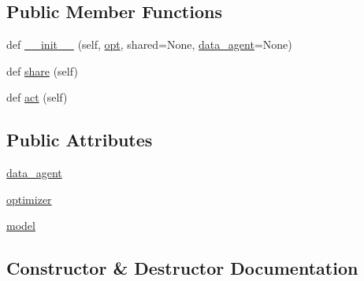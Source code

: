 \subsection*{Public Member Functions}
\begin{DoxyCompactItemize}
\item 
def \hyperlink{classprojects_1_1mastering__the__dungeon_1_1agents_1_1graph__world2_1_1agents_1_1ModelAgentBase_a2904306e4e9d603a78a72e65919fb63c}{\+\_\+\+\_\+init\+\_\+\+\_\+} (self, \hyperlink{classparlai_1_1core_1_1agents_1_1Agent_ab3b45d2754244608c75d4068b90cd051}{opt}, shared=None, \hyperlink{classprojects_1_1mastering__the__dungeon_1_1agents_1_1graph__world2_1_1agents_1_1ModelAgentBase_a229b7901e20dced7e3b3c3e2d381d2ce}{data\+\_\+agent}=None)
\item 
def \hyperlink{classprojects_1_1mastering__the__dungeon_1_1agents_1_1graph__world2_1_1agents_1_1ModelAgentBase_a337693c63ecfac3f01f9e430fb3f8fc9}{share} (self)
\item 
def \hyperlink{classprojects_1_1mastering__the__dungeon_1_1agents_1_1graph__world2_1_1agents_1_1ModelAgentBase_ae233cafdd579db9c82776eb58373145a}{act} (self)
\end{DoxyCompactItemize}
\subsection*{Public Attributes}
\begin{DoxyCompactItemize}
\item 
\hyperlink{classprojects_1_1mastering__the__dungeon_1_1agents_1_1graph__world2_1_1agents_1_1ModelAgentBase_a229b7901e20dced7e3b3c3e2d381d2ce}{data\+\_\+agent}
\item 
\hyperlink{classprojects_1_1mastering__the__dungeon_1_1agents_1_1graph__world2_1_1agents_1_1ModelAgentBase_ade53b46fb7a392e148f69d289c496252}{optimizer}
\item 
\hyperlink{classprojects_1_1mastering__the__dungeon_1_1agents_1_1graph__world2_1_1agents_1_1ModelAgentBase_af5ff64fd5cba16e5446686dba5ce0829}{model}
\end{DoxyCompactItemize}


\subsection{Constructor \& Destructor Documentation}
\mbox{\label{classprojects_1_1mastering__the__dungeon_1_1agents_1_1graph__world2_1_1agents_1_1ModelAgentBase_a2904306e4e9d603a78a72e65919fb63c}} 
